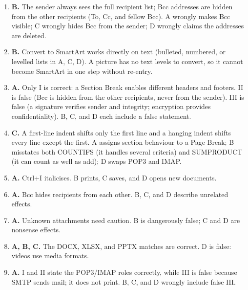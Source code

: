 \documentclass[11pt]{article}
\begin{document}
\begin{enumerate}[label=\textbf{Q\arabic*.}, leftmargin=*]
  wrongly claims POP3 syncs on the server.
\item \textbf{B.} The sender always sees the full recipient list; Bcc addresses
  are hidden from the other recipients (To, Cc, and fellow Bcc). A wrongly
  makes Bcc visible; C wrongly hides Bcc from the sender; D wrongly claims the
  addresses are deleted.
\item \textbf{B.} Convert to SmartArt works directly on text (bulleted,
  numbered, or levelled lists in A, C, D). A picture has no text levels to
  convert, so it cannot become SmartArt in one step without re-entry.
\item \textbf{A.} Only I is correct: a Section Break enables different headers
  and footers. II is false (Bcc is hidden from the other recipients, never
  from the sender). III is false (a signature verifies sender and integrity;
  encryption provides confidentiality). B, C, and D each include a false
  statement.
\item \textbf{C.} A first-line indent shifts only the first line and a hanging
  indent shifts every line except the first. A assigns section behaviour to a
  Page Break; B misstates both COUNTIFS (it handles several criteria) and
  SUMPRODUCT (it can count as well as add); D swaps POP3 and IMAP.

\item \textbf{A.} Ctrl+I italicises. B prints, C saves, and D opens new documents.
\item \textbf{A.} Bcc hides recipients from each other. B, C, and D describe unrelated effects.
\item \textbf{A.} Unknown attachments need caution. B is dangerously false; C and D are nonsense effects.
\item \textbf{A, B, C.} The DOCX, XLSX, and PPTX matches are correct. D is false: videos use media formats.
\item \textbf{A.} I and II state the POP3/IMAP roles correctly, while III is false because SMTP sends mail; it does not print. B, C, and D wrongly include false III.
\end{enumerate}
\def\JKSSBLessonID{61}\def\JKSSBAnswers{1}
\end{document}
